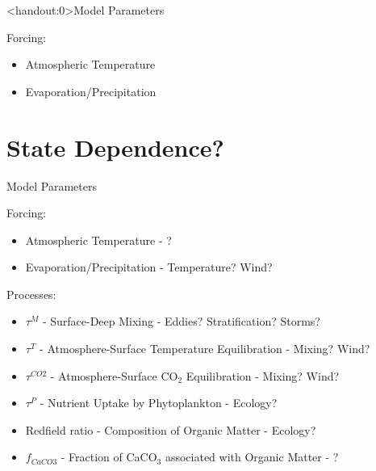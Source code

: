\documentclass[aspectratio=169]{beamer}
\begin{document}
\begin{frame}<handout:0>{Model Parameters}
    
    Forcing:
    \begin{itemize}
        \item Atmospheric Temperature
        \item Evaporation/Precipitation
    \end{itemize}


\end{frame}

\section{State Dependence?}

\begin{frame}{Model Parameters}
    
    Forcing:
    \begin{itemize}
        \item Atmospheric Temperature - {\color{QESdarkblue} ?}
        \item Evaporation/Precipitation - {\color{QESdarkblue} Temperature? Wind?}
    \end{itemize}

    Processes:
    \begin{itemize}
        \item $\tau^M$ - Surface-Deep Mixing - {\color{QESdarkblue} Eddies? Stratification? Storms?}
        \item $\tau^T$ - Atmosphere-Surface Temperature Equilibration - {\color{QESdarkblue} Mixing? Wind?}
        \item $\tau^{CO2}$ - Atmosphere-Surface CO$_2$ Equilibration - {\color{QESdarkblue} Mixing? Wind?}
        \item $\tau^P$ - Nutrient Uptake by Phytoplankton - {\color{QESdarkblue} Ecology?}
        \item Redfield ratio - Composition of Organic Matter - {\color{QESdarkblue} Ecology?}
        \item $f_{CaCO3}$ - Fraction of CaCO$_3$ associated with Organic Matter - {\color{QESdarkblue} \ce{\Omega}?}
    \end{itemize}

\end{frame}
\end{document}
